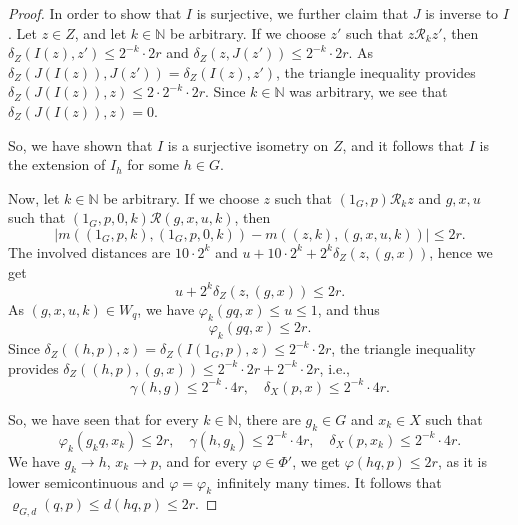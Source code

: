\documentclass[10pt,a4paper]{amsart}
\begin{document}
\begin{proof}
In order to show that $ I $ is surjective, we further claim that $ J $ is inverse to $ I $. Let $ z \in Z $, and let $ k \in \mathbb{N} $ be arbitrary. If we choose $ z' $ such that $ z \mathcal{R}_{k} z' $, then $ \delta_{Z}(I(z), z') \leq 2^{-k} \cdot 2r $ and $ \delta_{Z}(z, J(z')) \leq 2^{-k} \cdot 2r $. As $ \delta_{Z}(J(I(z)), J(z')) = \delta_{Z}(I(z), z') $, the triangle inequality provides $ \delta_{Z}(J(I(z)), z) \leq 2 \cdot 2^{-k} \cdot 2r $. Since $ k \in \mathbb{N} $ was arbitrary, we see that $ \delta_{Z}(J(I(z)), z) = 0 $.

So, we have shown that $ I $ is a surjective isometry on $ Z $, and it follows that $ I $ is the extension of $ I_{h} $ for some $ h \in G $.

Now, let $ k \in \mathbb{N} $ be arbitrary. If we choose $ z $ such that $ (1_{G}, p) \mathcal{R}_{k} z $ and $ g, x, u $ such that $ (1_{G}, p, 0, k) \mathcal{R} (g, x, u, k) $, then
$$ \big| m((1_{G}, p, k), (1_{G}, p, 0, k)) - m((z, k), (g, x, u, k)) \big| \leq 2r. $$
The involved distances are $ 10 \cdot 2^{k} $ and $ u + 10 \cdot 2^{k} + 2^{k} \delta_{Z}(z, (g, x)) $, hence we get
$$ u + 2^{k} \delta_{Z}(z, (g, x)) \leq 2r. $$
As $ (g, x, u, k) \in W_{q} $, we have $ \varphi_{k}(gq, x) \leq u \leq 1 $, and thus
$$ \varphi_{k}(gq, x) \leq 2r. $$
Since $ \delta_{Z}((h, p), z) = \delta_{Z}(I(1_{G}, p), z) \leq 2^{-k} \cdot 2r $, the triangle inequality provides $ \delta_{Z}((h, p), (g, x)) \leq 2^{-k} \cdot 2r + 2^{-k} \cdot 2r $, i.e.,
$$ \gamma(h, g) \leq 2^{-k} \cdot 4r, \quad \delta_{X}(p, x) \leq 2^{-k} \cdot 4r. $$

So, we have seen that for every $ k \in \mathbb{N} $, there are $ g_{k} \in G $ and $ x_{k} \in X $ such that
$$ \varphi_{k}(g_{k}q, x_{k}) \leq 2r, \quad \gamma(h, g_{k}) \leq 2^{-k} \cdot 4r, \quad \delta_{X}(p, x_{k}) \leq 2^{-k} \cdot 4r. $$
We have $ g_{k} \to h $, $ x_{k} \to p $, and for every $ \varphi \in \Phi' $, we get $ \varphi(hq, p) \leq 2r $, as it is lower semicontinuous and $ \varphi = \varphi_{k} $ infinitely many times. It follows that $ \varrho_{G, d}(q, p) \leq d(hq, p) \leq 2r $.
\end{proof}
\end{document}
